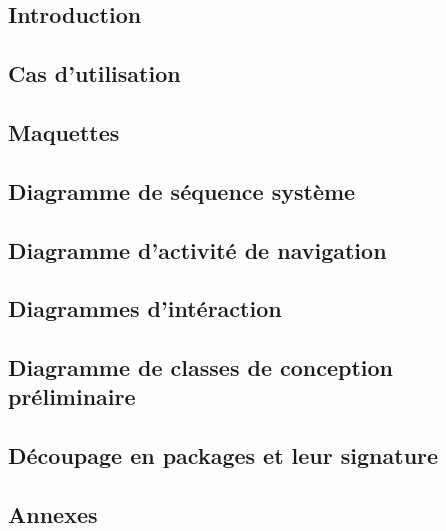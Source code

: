 \documentclass[asi]{picInsa}
\title{\DCP{}}
\author{\Florian{}, \Kafui{}, \Melissa{}, \Julie{}, \Mathieu{}} %
\begin{document}
\couverture{}

 \informationsGenerales{}


\tableofcontents

\setcounter{chapter}{0}


\chapter*{Introduction}
\label{intro}


\chapter{Cas d'utilisation}
\label{casUtilisation}


\chapter{Maquettes}
\label{maquettes}


\chapter{Diagramme de séquence système}
\label{diagrammeSequenceSysteme}


\chapter{Diagramme d'activité de navigation}
\label{diagrammeNavigation}


\chapter{Diagrammes d'intéraction}
\label{diagrammeInteraction}


\chapter{Diagramme de classes de conception préliminaire}
\label{diagrammeClasses}


\chapter{Découpage en packages et leur signature}
\label{diagrammePackages}


\begin{appendix}
\part*{Annexes}

\listoffigures
{}
	 
\listoftables
{}
\end{appendix}
\pageQuatriemeCouverture
\end{document}
